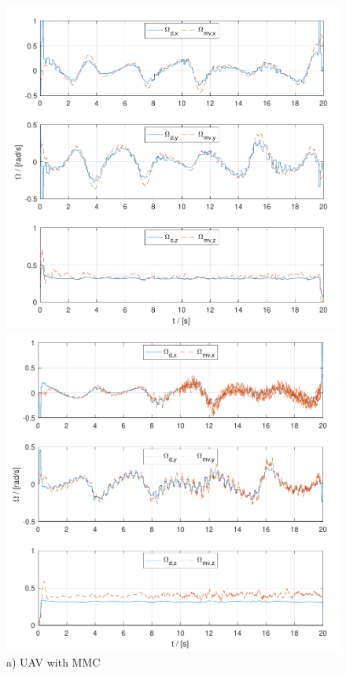 \begin{figure}
	\centering
	\begin{minipage}{0.5\columnwidth}
		\centering
		\includegraphics[width=\columnwidth]{./pictures/mmcuav_omega.pdf}
		\caption*{a) UAV with MMC}
		\label{fig:mmcuav_omega}
	\end{minipage}%
	\begin{minipage}{0.5\columnwidth}
		\centering
		\includegraphics[width=\columnwidth]{./pictures/mmuav_omega.pdf}

\end{minipage}
\end{figure}

